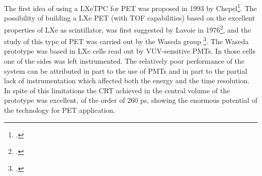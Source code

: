 The first idea of using a LXeTPC for PET was proposed in 1993 by Chepel\footcite{chepelFirst}. 
%
The possibility of building a LXe PET (with TOF capabilities) based on the excellent properties of LXe as scintillator, was first suggested by Lavoie in 1976\footcite{lavoie}, and the study of this type of PET was carried out by the Waseda group \footcite{Doke1,Nishikido2,Nishikido1}. The Waseda prototype was based in LXe cells read out by VUV-sensitive PMTs. In those cells one of the sides was left instrumented. The relatively poor performance of the system can be attributed in part to the use of PMTs and in part to the partial lack of instrumentation which affected both the energy and the time resolution. In spite of this limitations 
the CRT achieved in the central volume of the prototype was excellent, of the order of 260 ps, showing the enormous potential of the technology for PET application. 

